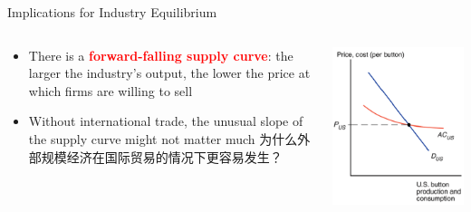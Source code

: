 \documentclass[10pt,hyperref={CJKbookmarks=true},xcolor=dvipsnames,aspectratio=169]{beamer}
\begin{document}
\begin{frame}{Implications for Industry Equilibrium}


\begin{columns}[onlytextwidth]
\begin{column}{0.6\textwidth}
\begin{itemize}
\item There is a \textbf{\textcolor{red}{forward-falling supply curve}}:
the larger the industry’s output, the lower the price at which firms
are willing to sell 
\item Without international trade, the unusual slope of the supply curve
might not matter much 为什么外部规模经济在国际贸易的情况下更容易发生？
\end{itemize}

\end{column}
\begin{column}{0.4\textwidth}
\includegraphics[width=\columnwidth]{fig/krugman/lec6-6}
\end{column}
\end{columns}

\end{frame}
\end{document}
